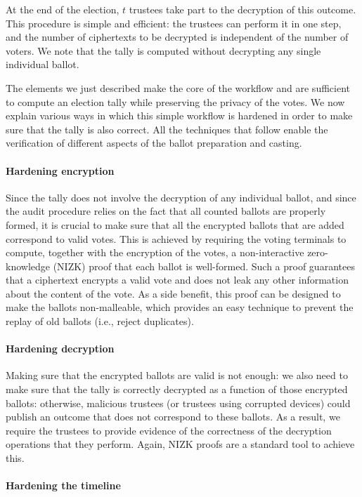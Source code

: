 At the end of the election, $t$ trustees take part to the decryption
of this outcome. This procedure is simple and efficient: the trustees
can perform it in one step, and the number of ciphertexts to be
decrypted is independent of the number of voters. We note that the
tally is computed without decrypting any single individual ballot.

The elements we just described make the core of the workflow and are
sufficient to compute an election tally while preserving the privacy
of the votes. We now explain various ways in which this simple
workflow is hardened in order to make sure that the tally is also
correct. All the techniques that follow enable the verification of
different aspects of the ballot preparation and casting.

\paragraph{Hardening encryption}
\label{sec:hardening-encryption}
Since the tally does not involve the decryption of any individual
ballot, and since the audit procedure relies on the fact that all
counted ballots are properly formed, it is crucial to make sure that
all the encrypted ballots that are added correspond to valid votes.
This is achieved by requiring the voting terminals to compute,
together with the encryption of the votes, a non-interactive
zero-knowledge (NIZK) proof that each ballot is well-formed. Such a
proof guarantees that a ciphertext encrypts a valid vote and does not
leak any other information about the content of the vote. As a side
benefit, this proof can be designed to make the ballots non-malleable,
which provides an easy technique to prevent the replay of old ballots
(i.e., reject duplicates).

\paragraph{Hardening decryption}
\label{sec:hardening-decryption}
Making sure that the encrypted ballots are valid is not enough: we
also need to make sure that the tally is correctly decrypted as a
function of those encrypted ballots: otherwise, malicious trustees (or
trustees using corrupted devices) could publish an outcome that does
not correspond to these ballots. As a result, we require the trustees
to provide evidence of the correctness of the decryption operations
that they perform.  Again, NIZK proofs are a standard tool to achieve
this.

\paragraph{Hardening the timeline}
\label{sec:hard-timeline}

